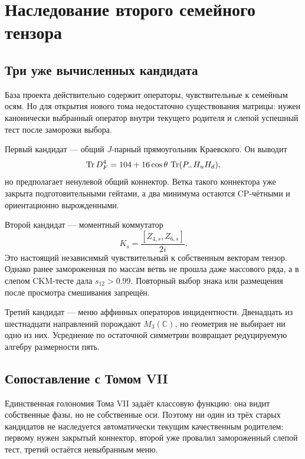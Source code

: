 \chapter{Наследование второго семейного тензора}
\label{ch:v8-second-family-tensor-inheritance-no-go-gate}

\section{Три уже вычисленных кандидата}

База проекта действительно содержит операторы, чувствительные к семейным
осям. Но для открытия нового тома недостаточно существования матрицы: нужен
канонически выбранный оператор внутри текущего родителя и слепой успешный
тест после заморозки выбора.

Первый кандидат --- общий $J$-парный прямоугольник Краевского. Он выводит
\begin{equation}
 \operatorname{Tr} D_F^4=104+16\cos\theta\,\operatorname{Tr}(P_-H_uH_d),
\end{equation}
но предполагает ненулевой общий коннектор. Ветка такого коннектора уже
закрыта подготовительными гейтами, а два минимума остаются CP-чётными и
ориентационно вырожденными.

Второй кандидат --- моментный коммутатор
\begin{equation}
 K_s=\frac{[Z_{4,s},Z_{6,s}]}{2i}.
 \label{eq:v8-moment-commutator-candidate}
\end{equation}
Это настоящий независимый чувствительный к собственным векторам тензор. Однако ранее
замороженная по массам ветвь не прошла даже массового ряда, а в слепом CKM-тесте
дала $s_{12}>0.99$. Повторный выбор знака или размещения после просмотра
смешивания запрещён.

Третий кандидат --- меню аффинных операторов инцидентности. Двенадцать из
шестнадцати направлений порождают $M_3(\mathbb C)$, но геометрия не выбирает
ни одно из них. Усреднение по остаточной симметрии возвращает редуцируемую
алгебру размерности пять.

\section{Сопоставление с Томом VII}

Единственная голономия Тома VII задаёт классовую функцию: она видит
собственные фазы, но не собственные оси. Поэтому ни один из трёх старых
кандидатов не наследуется автоматически текущим качественным родителем:
первому нужен закрытый коннектор, второй уже провалил замороженный слепой
тест, третий остаётся невыбранным меню.

